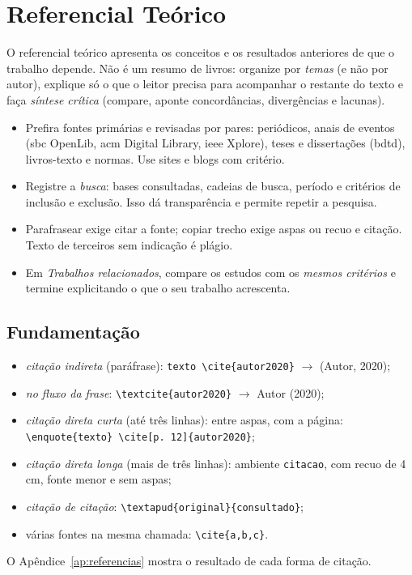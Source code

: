 \chapter{Referencial Teórico}\label{sec:RefTeorico}

\begin{dica}
O referencial teórico apresenta os conceitos e os resultados anteriores de que o
trabalho depende. Não é um resumo de livros: organize por \emph{temas} (e não por
autor), explique só o que o leitor precisa para acompanhar o restante do texto e faça
\emph{síntese crítica} (compare, aponte concordâncias, divergências e lacunas).
\begin{itemize}
  \item Prefira fontes primárias e revisadas por pares: periódicos, anais de eventos
        (\ac{sbc} OpenLib, \ac{acm} Digital Library, \ac{ieee} Xplore), teses e
        dissertações (\ac{bdtd}), livros-texto e normas. Use sites e blogs com critério.
  \item Registre a \emph{busca}: bases consultadas, cadeias de busca, período e
        critérios de inclusão e exclusão. Isso dá transparência e permite repetir a pesquisa.
  \item Parafrasear exige citar a fonte; copiar trecho exige aspas ou recuo e citação.
        Texto de terceiros sem indicação é plágio.
  \item Em \emph{Trabalhos relacionados}, compare os estudos com os \emph{mesmos
        critérios} e termine explicitando o que o seu trabalho acrescenta.
\end{itemize}
\end{dica}

\section{Fundamentação}\label{sec:fundamentacao}

\begin{dica}
\begin{itemize}
  \item \emph{citação indireta} (paráfrase): \texttt{texto \textbackslash cite\{autor2020\}} $\to$ (Autor, 2020);
  \item \emph{no fluxo da frase}: \texttt{\textbackslash textcite\{autor2020\}} $\to$ Autor (2020);
  \item \emph{citação direta curta} (até três linhas): entre aspas, com a página:
        \texttt{\textbackslash enquote\{texto\} \textbackslash cite[p.~12]\{autor2020\}};
  \item \emph{citação direta longa} (mais de três linhas): ambiente \texttt{citacao},
        com recuo de 4 cm, fonte menor e sem aspas;
  \item \emph{citação de citação}: \texttt{\textbackslash textapud\{original\}\{consultado\}};
  \item várias fontes na mesma chamada: \texttt{\textbackslash cite\{a,b,c\}}.
\end{itemize}
O Apêndice~\ref{ap:referencias} mostra o resultado de cada forma de citação.
\end{dica}

